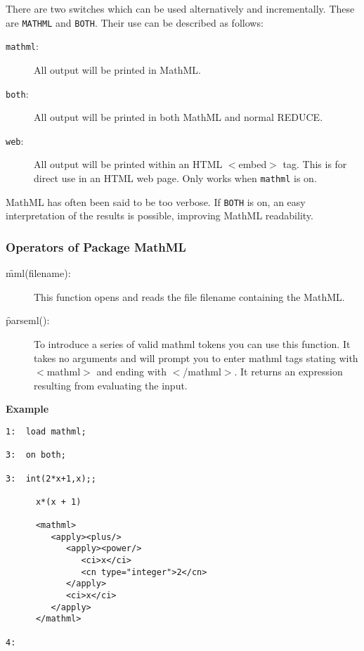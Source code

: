 There are two switches which can be used alternatively and incrementally.
These are {\tt MATHML} and {\tt BOTH}. Their use can be described as
follows:

\begin{description}
\item[{\tt mathml}:] All output will be printed in MathML.
\item[{\tt both}:] All output will be printed in both MathML and normal
REDUCE.
\item[{\tt web}:] All output will be printed within an HTML $<$embed$>$ tag. 
This is for direct use in an HTML web page. Only works when {\tt mathml} is on.
\end{description}

MathML has often been said to be too verbose. If {\tt BOTH} is on, an easy
interpretation of the results is possible, improving MathML readability.

\subsubsection{Operators of Package MathML}

\begin{description}
\item[\f{mml}(filename):] This function opens and reads the file filename 
containing the MathML.
\item[\f{parseml}():] To introduce a series of valid mathml tokens you
can use this function. It takes no arguments and will prompt you to enter mathml tags
stating with $<$mathml$>$ and ending with $<$/mathml$>$. It returns an expression resulting 
from evaluating the input.
\end{description}

{\bf Example}
\begin{verbatim}
1:  load mathml;

3:  on both;

3:  int(2*x+1,x);;

      x*(x + 1) 

      <mathml>
         <apply><plus/>
            <apply><power/>
               <ci>x</ci>
               <cn type="integer">2</cn>
            </apply>
            <ci>x</ci>
         </apply>
      </mathml>

4:

\end{verbatim}

